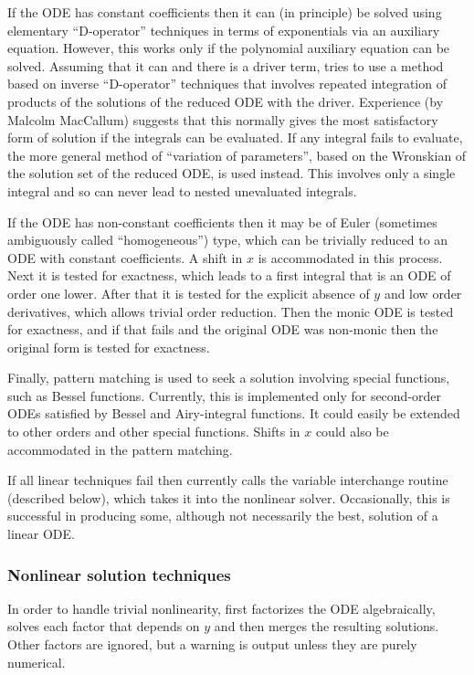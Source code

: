 If the ODE has constant coefficients then it can (in principle) be
solved using elementary ``D-operator'' techniques in terms of
exponentials via an auxiliary equation.  However, this works only if
the polynomial auxiliary equation can be solved.  Assuming that it can
and there is a driver term,  tries to use a method based
on inverse ``D-operator'' techniques that involves repeated
integration of products of the solutions of the reduced ODE with the
driver.  Experience (by Malcolm MacCallum) suggests that this normally
gives the most satisfactory form of solution if the integrals can be
evaluated.  If any integral fails to evaluate, the more general method
of ``variation of parameters'', based on the Wronskian of the solution
set of the reduced ODE, is used instead.  This involves only a single
integral and so can never lead to nested unevaluated integrals.

If the ODE has non-constant coefficients then it may be of Euler
(sometimes ambiguously called ``homogeneous'') type, which can be
trivially reduced to an ODE with constant coefficients.  A shift in
$x$ is accommodated in this process.  Next it is tested for exactness,
which leads to a first integral that is an ODE of order one lower.
After that it is tested for the explicit absence of $y$ and low order
derivatives, which allows trivial order reduction.  Then the monic ODE
is tested for exactness, and if that fails and the original ODE was
non-monic then the original form is tested for exactness.

Finally, pattern matching is used to seek a solution involving special
functions, such as Bessel functions.  Currently, this is implemented
only for second-order ODEs satisfied by Bessel and Airy-integral
functions.  It could easily be extended to other orders and other
special functions.  Shifts in $x$ could also be accommodated in the
pattern matching.

If all linear techniques fail then  currently calls the
variable interchange routine (described below), which takes it into
the nonlinear solver.  Occasionally, this is successful in producing
some, although not necessarily the best, solution of a linear ODE.


\subsubsection{Nonlinear solution techniques}

In order to handle trivial nonlinearity,  first
factorizes the ODE algebraically, solves each factor that depends on
$y$ and then merges the resulting solutions.  Other factors are
ignored, but a warning is output unless they are purely numerical.

